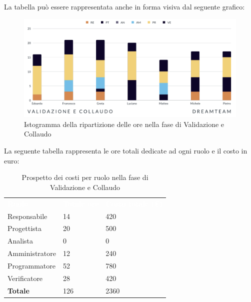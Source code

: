 La tabella può essere rappresentata anche in forma visiva dal seguente grafico:
\begin{figure}[H]
\centering
\includegraphics[scale=0.65]{Sezioni/SezioniPreventivo/grafici/Validazione_collaudo.png}
\caption{Istogramma della ripartizione delle ore nella fase di Validazione e Collaudo}
\end{figure}

La seguente tabella rappresenta le ore totali dedicate ad ogni ruolo e il costo in euro:

\begin{table}[H]
\begin{center}
\renewcommand{\arraystretch}{1.5}
\begin{tabular}{ m{}<{\centering}  m{}<{\centering} m{}<{\centering}}
	\rowcolor{darkblue}
	\textcolor{white}{\textbf{Ruolo}}&\textcolor{white}{\textbf{Totale ore}}&\textcolor{white}{\textbf{Costo totale (\euro)}}\\ 

	Responsabile  & 14 & 420 \\	
	
	Progettista & 20 & 500 \\
	
	Analista & 0 & 0 \\

	Amministratore & 12 & 240 \\
	
	Programmatore & 52 & 780 \\
	
	Verificatore & 28 & 420 \\
	
	\textbf{Totale} & 126 & 2360 \\
	
\end{tabular}
\caption{Prospetto dei costi per ruolo nella fase di Validazione e Collaudo}
\end{center}
\end{table}

